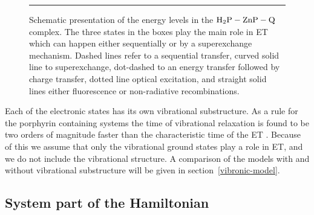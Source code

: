 \documentclass[12pt,twoside,a4paper]{report}
\begin{document}
\footnotesize\begin{figure}[!h]\centering
  \parbox{7.3cm}
  {\rule{-1cm}{0cm}
\epsfxsize=9cm
}
\label{chem-schema}
\caption[Schematic presentation of the energy levels in the ${\rm H_2P}-{\rm ZnP}-{\rm Q}$]
{\small Schematic presentation of the energy levels in the ${\rm H_2P}-{\rm ZnP}-{\rm Q}$ complex. 
The three states in the boxes play
the main role in ET
which  
can happen either sequentially or by a superexchange mechanism. 
Dashed lines refer to a sequential transfer,
curved solid line to superexchange, 
dot-dashed to an energy transfer followed by charge transfer,
dotted line optical excitation, and
straight solid lines either fluorescence or non-radiative recombinations.
}
\end{figure}\normalsize
Each of the electronic states has its own vibrational substructure. 
As a rule for the porphyrin containing systems
the time of vibrational relaxation
%                   
%
is found to be two orders of magnitude faster than the characteristic time of the
ET \cite{zewa96}. Because of this we assume that only the
vibrational ground states play a role in ET, and we do
not include the vibrational structure.
A comparison of the models with and without 
vibrational substructure will be given in section~\ref{vibronic-model}. 
  
\subsection{System part of the Hamiltonian\label{chem-isolate}}
 
\end{document}
